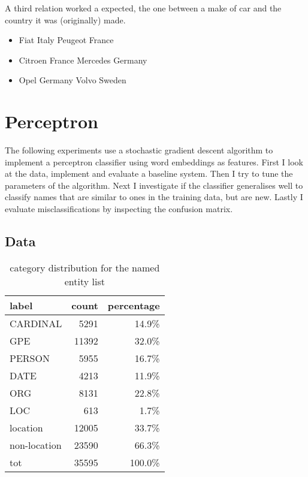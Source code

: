 \documentclass[11pt]{article}
\begin{document}
A third relation worked a expected, the one between a make of car and the country it was (originally) made.

\begin{itemize}
\item[] Fiat Italy Peugeot France
\item[] Citroen France Mercedes Germany
\item[] Opel Germany Volvo Sweden
\end{itemize}

\section{Perceptron}

The following experiments use a stochastic gradient descent algorithm to implement a perceptron classifier using word embeddings as features. First I look at the data, implement and evaluate a baseline system. Then I try to tune the parameters of the algorithm. Next I investigate if the classifier generalises well to classify names that are similar to ones in the training data, but are new. Lastly I evaluate misclassifications by inspecting the confusion matrix.

\subsection{Data}

\begin{table}[ht]
  \caption{category distribution for the named entity list}
  \label{tab:ne-cats}
  \begin{tabular}{ l r r }
    label & count & percentage \\
    \hline
    CARDINAL     &  5291 &  14.9\% \\
    GPE          & 11392 &  32.0\% \\
    PERSON       &  5955 &  16.7\% \\
    DATE         &  4213 &  11.9\% \\
    ORG          &  8131 &  22.8\% \\
    LOC          &   613 &   1.7\% \\
    location     & 12005 &  33.7\% \\
    non-location & 23590 &  66.3\% \\
    tot          & 35595 & 100.0\% \\
  \end{tabular}
\end{table}
\end{document}
